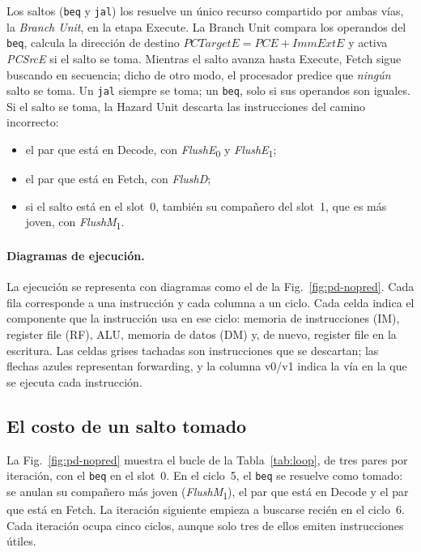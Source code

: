 \documentclass[11pt,a4paper]{article}
\newcommand{\sig}[1]{\textit{#1}}
\newcommand{\sigk}[2]{\textit{#1}\textsubscript{#2}}
\newcommand{\ins}[1]{\texttt{#1}}
\begin{document}
Los saltos (\ins{beq} y \ins{jal}) los resuelve un único recurso compartido por ambas vías,
la \emph{Branch Unit}, en la etapa Execute. La Branch Unit compara los operandos del
\ins{beq}, calcula la dirección de destino $\sig{PCTargetE} = \sig{PCE} + \sig{ImmExtE}$ y
activa \sig{PCSrcE} si el salto se toma. Mientras el salto avanza hasta Execute, Fetch sigue
buscando en secuencia; dicho de otro modo, el procesador predice que \emph{ningún} salto se
toma. Un \ins{jal} siempre se toma; un \ins{beq}, solo si sus operandos son iguales. Si el
salto se toma, la Hazard Unit descarta las instrucciones del camino incorrecto:
\begin{itemize}
  \item el par que está en Decode, con \sigk{FlushE}{0} y \sigk{FlushE}{1};
  \item el par que está en Fetch, con \sig{FlushD};
  \item si el salto está en el slot~0, también su compañero del slot~1, que es más joven,
        con \sigk{FlushM}{1}.
\end{itemize}

\paragraph{Diagramas de ejecución.} La ejecución se representa con diagramas como el de la
Fig.~\ref{fig:pd-nopred}. Cada fila corresponde a una instrucción y cada columna a un ciclo.
Cada celda indica el componente que la instrucción usa en ese ciclo: memoria de
instrucciones (IM), register file (RF), ALU, memoria de datos (DM) y, de nuevo, register file
en la escritura. Las celdas grises tachadas son instrucciones que se descartan; las flechas
azules representan forwarding, y la columna \textsf{v0}/\textsf{v1} indica la vía en la que
se ejecuta cada instrucción.

\subsection{El costo de un salto tomado}

La Fig.~\ref{fig:pd-nopred} muestra el bucle de la Tabla~\ref{tab:loop}, de tres pares
por iteración, con el \ins{beq} en el slot~0. En el ciclo~5, el \ins{beq} se resuelve como
tomado: se anulan su compañero más joven (\sigk{FlushM}{1}), el par que está en Decode y
el par que está en Fetch. La iteración siguiente empieza a buscarse recién en el ciclo~6.
Cada iteración ocupa cinco ciclos, aunque solo tres de ellos emiten instrucciones útiles.
\end{document}
